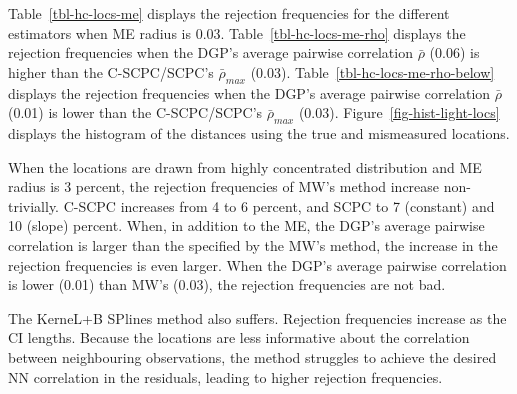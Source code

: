 \documentclass[
]{article}
\begin{document}
Table~\ref{tbl-hc-locs-me} displays the rejection frequencies for the
different estimators when ME radius is 0.03.
Table~\ref{tbl-hc-locs-me-rho} displays the rejection frequencies when
the DGP's average pairwise correlation \(\bar\rho\) (0.06) is higher
than the C-SCPC/SCPC's \(\bar\rho_{max}\) (0.03).
Table~\ref{tbl-hc-locs-me-rho-below} displays the rejection frequencies
when the DGP's average pairwise correlation \(\bar\rho\) (0.01) is lower
than the C-SCPC/SCPC's \(\bar\rho_{max}\) (0.03).
Figure~\ref{fig-hist-light-locs} displays the histogram of the distances
using the true and mismeasured locations.

When the locations are drawn from highly concentrated distribution and
ME radius is 3 percent, the rejection frequencies of MW's method
increase non-trivially. C-SCPC increases from 4 to 6 percent, and SCPC
to 7 (constant) and 10 (slope) percent. When, in addition to the ME, the
DGP's average pairwise correlation is larger than the specified by the
MW's method, the increase in the rejection frequencies is even larger.
When the DGP's average pairwise correlation is lower (0.01) than MW's
(0.03), the rejection frequencies are not bad.

The KerneL+B SPlines method also suffers. Rejection frequencies increase
as the CI lengths. Because the locations are less informative about the
correlation between neighbouring observations, the method struggles to
achieve the desired NN correlation in the residuals, leading to higher
rejection frequencies.
\end{document}
